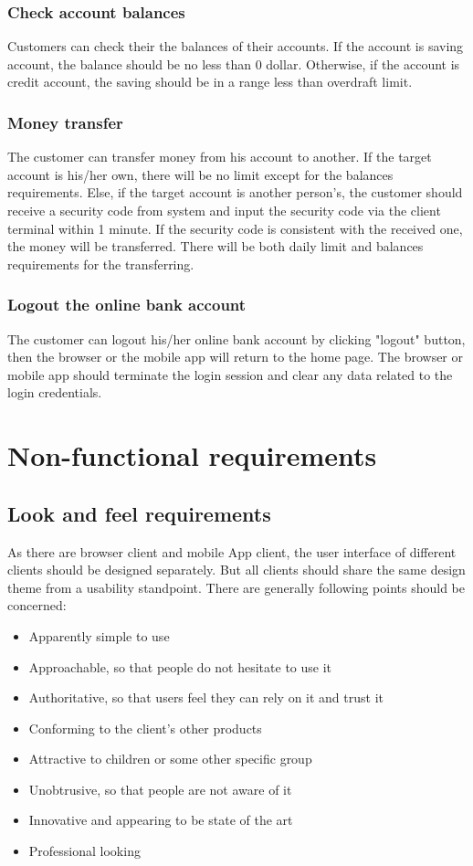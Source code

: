 \documentclass{scrreprt}
\begin{document}
\subsection{Check account balances}
Customers can check their the balances of their accounts. If the account is saving account, the balance should be no less than 0 dollar. Otherwise, if the account is credit account, the saving should be in a range less than overdraft limit.

\subsection{Money transfer}
The customer can transfer money from his account to another. If the target account is his/her own, there will be no limit except for the balances requirements. Else, if the target account is another person's, the customer should receive a security code from system and input the security code via the client terminal within 1 minute. If the security code is consistent with the received one, the money will be transferred. There will be both daily limit and balances requirements for the transferring.


\subsection{Logout the online bank account}
The customer can logout his/her online bank account by clicking "logout" button, then the browser or the mobile app will return to the home page. The browser or mobile app should terminate the login session and clear any data related to the login credentials.


\chapter{Non-functional requirements}
\section{Look and feel requirements}
As there are browser client and mobile App client, the user interface of different clients should be designed separately. But all clients should share the same design theme from a usability standpoint. There are generally following points should be concerned:
\begin{itemize}
    \item Apparently simple to use
    \item Approachable, so that people do not hesitate to use it
    \item Authoritative, so that users feel they can rely on it and trust it
    \item Conforming to the client's other products
    \item Attractive to children or some other specific group
    \item Unobtrusive, so that people are not aware of it
    \item Innovative and appearing to be state of the art
    \item Professional looking
\end{itemize}
\end{document}
